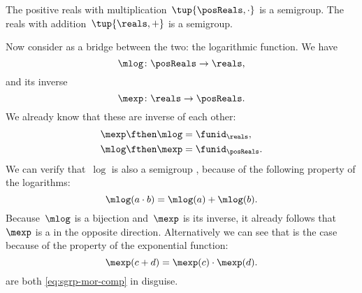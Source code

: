 \begin{example}
    The positive reals with multiplication~$\tup{\posReals, \cdot}$ is a semigroup.
    The reals with addition~$\tup{\reals, +}$ is a semigroup.

    Now consider as a bridge between the two: the logarithmic function.
    We have
    \begin{equation}
        \label{eq:log}
        \mlog \colon  \posReals \to \reals,
    \end{equation}
    and its inverse
    \begin{equation}
        \label{eq:exp}
        \mexp \colon  \reals \to \posReals.
    \end{equation}
    We already know that these are inverse of each other:
    \begin{equation}
        \label{eq:exp-log-are-inverses}
        \begin{aligned}
            \mexp \fthen \mlog & = \funid_{\reals}, \\
            \mlog \fthen \mexp & = \funid_{\posReals}.
        \end{aligned}
    \end{equation}
    We can verify that~$\log$ is also a semigroup \whomo, because of the following property of the logarithms:
    \begin{equation}
        \label{eq:log-property}
        \mlog(a \cdot b) = \mlog(a) + \mlog(b).
    \end{equation}
    Because~$\mlog$ is a bijection and~$\mexp$ is its inverse, it already follows that~$\mexp$ is a \whomo in the opposite direction.
    Alternatively we can see that is the case because of the property of the exponential function:
    \begin{equation}
        \label{eq:exp-property}
        \mexp(c + d) = \mexp(c) \cdot \mexp(d).
    \end{equation}
     are both \cref{eq:sgrp-mor-comp} in disguise.
\end{example}

